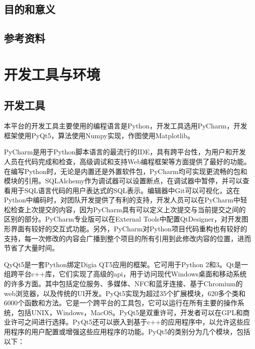 \documentclass[cn,11pt,chinese]{elegantbook}
\begin{document}
\section{目的和意义}


\section{参考资料}


\chapter{开发工具与环境}


\section{开发工具}

本平台的开发工具主要使用的编程语言是Python，开发工具选用PyCharm，开发框架使用PyQt5，算法使用Numpy实现，作图使用Matplotlib。

PyCharm是用于Python脚本语言的最流行的IDE，具有跨平台性，为用户和开发人员在代码完成和检查，高级调试和支持Web编程框架等方面提供了最好的功能。在编写Python时，无论是内置还是外置软件包，PyCharm均可实现更流畅的包和模块的引用。SQLAlchemy作为调试器可以设置断点，在调试器中暂停，并可以查看用于SQL语言代码的用户表达式的SQL表示。编辑器中Git可以可视化，这在Python中编码时，对团队开发提供了有利的支持，开发人员可以在PyCharm中轻松检查上次提交的内容，因为PyCharm具有可以定义上次提交与当前提交之间的区别的部分。PyCharm专业版可以在External Tools中配置QtDesigner，对开发图形界面有较好的交互式功能。另外，PyCharm对Python项目代码重构也有较好的支持，每一次修改的内容会广播到整个项目的所有引用到此修改内容的位置，进而节省了大量时间。

QyQt5是一套Python绑定Digia QT5应用的框架。它可用于Python 2和3。Qt是一组跨平台c++库，它们实现了高级的api，用于访问现代Windows桌面和移动系统的许多方面。其中包括定位服务、多媒体、NFC和蓝牙连接、基于Chromium的web浏览器，以及传统的UI开发。PyQt5实现为超过35个扩展模块，620多个类和6000个函数和方法。它是一个跨平台的工具包，它可以运行在所有主要的操作系统，包括UNIX，Windows，MacOS。PyQt5是双重许可，开发者可以在GPL和商业许可之间进行选择。PyQt5还可以嵌入到基于c++的应用程序中，以允许这些应用程序的用户配置或增强这些应用程序的功能。PyQt5的类别分为几个模块，包括以下：
\end{document}
